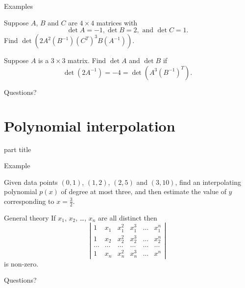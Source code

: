 \documentclass{beamer}
\begin{document}
\begin{frame}{Examples}
  \begin{example}
    Suppose $A$, $B$ and $C$ are $4\times 4$ matrices with
    \[ \det A = -1, \det B = 2, \mbox{ and } \det C=1.\]
    Find $\det(2A^2(B^{-1})(C^T)^3 B(A^{-1}))$.
  \end{example}
  \begin{example}
    Suppose $A$ is a $3\times 3$ matrix.
    Find $\det A$ and $\det B$ if
    \[ \det(2A^{-1})=-4=\det(A^3(B^{-1})^T).\]
  \end{example}
\end{frame}

\begin{frame}
  Questions?
\end{frame}

\section{Polynomial interpolation}

\begin{frame}
  \begin{beamercolorbox}[sep=12pt,center]{part title}
    \insertsection\par
  \end{beamercolorbox}
\end{frame}

\begin{frame}{Example}
  \begin{example}
    Given data points $(0,1)$, $(1,2)$, $(2,5)$ and $(3,10)$,
    find an interpolating polynomial 
    $p(x)$ of degree at most three, 
    and then estimate the value of $y$ corresponding to $x=\frac{3}{2}$.
  \end{example}
\end{frame}

\begin{frame}{General theory}
  If $x_1$, $x_2$, \dots, $x_n$ are all distinct then
  \begin{equation*}
    \left|
      \begin{array}{cccccc}
        1&x_1&x_1^2&x_1^3&\dots&x_1^n\\
        1&x_2&x_2^2&x_2^3&\dots&x_2^n\\
        \dots&\dots&\dots&\dots&\dots&\dots\\
        1&x_n&x_n^2&x_n^3&\dots&x^n
      \end{array}
    \right|
  \end{equation*}
  is non-zero.
\end{frame}

\begin{frame}
  Questions?
\end{frame}
\end{document}
